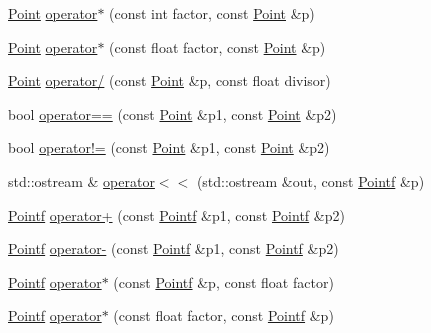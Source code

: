 \begin{DoxyCompactItemize}
\item 
\hyperlink{classprism_1_1geometry_1_1_point}{Point} \hyperlink{namespaceprism_1_1geometry_a08df2c2279edb7ca715fa0edf3470222}{operator$\ast$} (const int factor, const \hyperlink{classprism_1_1geometry_1_1_point}{Point} \&p)
\item 
\hyperlink{classprism_1_1geometry_1_1_point}{Point} \hyperlink{namespaceprism_1_1geometry_a46982118b6e674be47b32b679b2c5163}{operator$\ast$} (const float factor, const \hyperlink{classprism_1_1geometry_1_1_point}{Point} \&p)
\item 
\hyperlink{classprism_1_1geometry_1_1_point}{Point} \hyperlink{namespaceprism_1_1geometry_af0842ada9ec34acdae02fa7f5661be4c}{operator/} (const \hyperlink{classprism_1_1geometry_1_1_point}{Point} \&p, const float divisor)
\item 
bool \hyperlink{namespaceprism_1_1geometry_afcf58c103c45cbc3efe1f27ab1a6ce5d}{operator==} (const \hyperlink{classprism_1_1geometry_1_1_point}{Point} \&p1, const \hyperlink{classprism_1_1geometry_1_1_point}{Point} \&p2)
\item 
bool \hyperlink{namespaceprism_1_1geometry_ad5082e6b1ddbb8b35e2d2956682458b3}{operator!=} (const \hyperlink{classprism_1_1geometry_1_1_point}{Point} \&p1, const \hyperlink{classprism_1_1geometry_1_1_point}{Point} \&p2)
\item 
std\+::ostream \& \hyperlink{namespaceprism_1_1geometry_a2eb1fc2955860f637c80d1d54fe61ced}{operator$<$$<$} (std\+::ostream \&out, const \hyperlink{classprism_1_1geometry_1_1_pointf}{Pointf} \&p)
\item 
\hyperlink{classprism_1_1geometry_1_1_pointf}{Pointf} \hyperlink{namespaceprism_1_1geometry_a215cdbb09b1432a2bca98fefe655f0d0}{operator+} (const \hyperlink{classprism_1_1geometry_1_1_pointf}{Pointf} \&p1, const \hyperlink{classprism_1_1geometry_1_1_pointf}{Pointf} \&p2)
\item 
\hyperlink{classprism_1_1geometry_1_1_pointf}{Pointf} \hyperlink{namespaceprism_1_1geometry_a0e48ef6a6a3d9b6a14cce34167b9da0b}{operator-\/} (const \hyperlink{classprism_1_1geometry_1_1_pointf}{Pointf} \&p1, const \hyperlink{classprism_1_1geometry_1_1_pointf}{Pointf} \&p2)
\item 
\hyperlink{classprism_1_1geometry_1_1_pointf}{Pointf} \hyperlink{namespaceprism_1_1geometry_abb59a6831ade3bb2f471b8e8d56c37a7}{operator$\ast$} (const \hyperlink{classprism_1_1geometry_1_1_pointf}{Pointf} \&p, const float factor)
\item 
\hyperlink{classprism_1_1geometry_1_1_pointf}{Pointf} \hyperlink{namespaceprism_1_1geometry_a83b73ec76a36ddd4a983b1831b27d538}{operator$\ast$} (const float factor, const \hyperlink{classprism_1_1geometry_1_1_pointf}{Pointf} \&p)

\end{DoxyCompactItemize}
